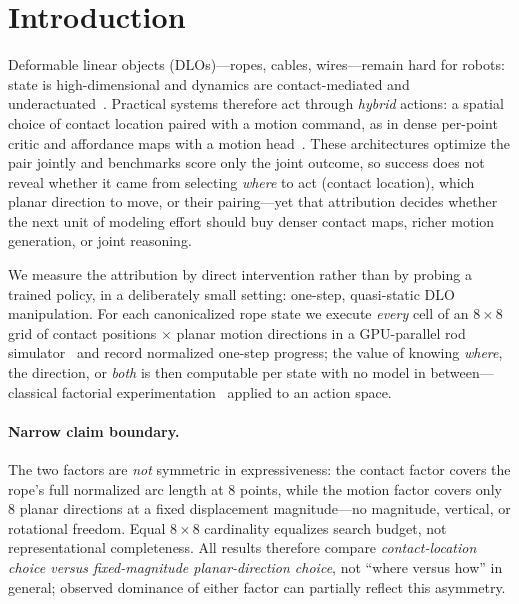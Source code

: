 \documentclass{article}
\begin{document}
\section{Introduction}
Deformable linear objects (DLOs)---ropes, cables, wires---remain hard for
robots: state is high-dimensional and dynamics are contact-mediated and
underactuated~\citep{sanchez2018robotic,zhu2022challenges}. Practical systems
therefore act through \emph{hybrid} actions: a spatial choice of contact
location paired with a motion command, as in dense per-point critic and
affordance maps with a motion
head~\citep{zhou2023hacman,mo2021where2act,wu2023foresightful,
zeng2021transporter}. These architectures optimize the pair jointly and
benchmarks score only the joint outcome, so success does not reveal whether
it came from selecting \emph{where} to act (contact location), which planar
direction to move, or their pairing---yet that attribution decides whether
the next unit of modeling effort should buy denser contact maps, richer
motion generation, or joint reasoning.

We measure the attribution by direct intervention rather than by probing a
trained policy, in a deliberately small setting: one-step, quasi-static DLO
manipulation. For each canonicalized rope state we execute \emph{every}
cell of an $8{\times}8$ grid of contact positions $\times$ planar motion
directions in a GPU-parallel rod simulator~\citep{cao2026dlolab} and record
normalized one-step progress; the value of knowing \emph{where}, the
direction, or \emph{both} is then computable per state with no model in
between---classical factorial experimentation~\citep{montgomery2017design}
applied to an action space.

\paragraph{Narrow claim boundary.}
The two factors are \emph{not} symmetric in expressiveness: the contact
factor covers the rope's full normalized arc length at 8 points, while the
motion factor covers only 8 planar directions at a fixed displacement
magnitude---no magnitude, vertical, or rotational freedom. Equal
$8{\times}8$ cardinality equalizes search budget, not representational
completeness. All results therefore compare \emph{contact-location choice
versus fixed-magnitude planar-direction choice}, not ``where versus how'' in
general; observed dominance of either factor can partially reflect this
asymmetry.
\end{document}
